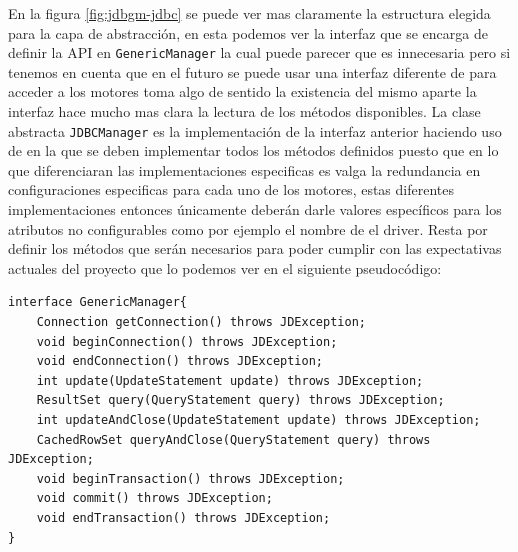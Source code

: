En la figura \ref{fig:jdbgm-jdbc} se puede ver mas claramente la estructura elegida para la capa de abstracción, en esta podemos ver la interfaz que se encarga de definir la API en \verb=GenericManager= la cual puede parecer que es innecesaria pero si tenemos en cuenta que en el futuro se puede usar una interfaz diferente de \jd para acceder a los motores toma algo de sentido la existencia del mismo aparte la interfaz hace mucho mas clara la lectura de los métodos disponibles. La clase abstracta \verb=JDBCManager= es la implementación de la interfaz anterior haciendo uso de \jd en la que se deben implementar todos los métodos definidos puesto que en lo que diferenciaran las implementaciones especificas es valga la redundancia en configuraciones especificas para cada uno de los motores, estas diferentes implementaciones entonces únicamente deberán darle valores específicos para los atributos no configurables como por ejemplo el nombre de el driver. Resta por definir los métodos que serán necesarios para poder cumplir con las expectativas actuales del proyecto que lo podemos ver en el siguiente pseudocódigo:
%
\begin{lstlisting}[title=interfaz GenericManager]
interface GenericManager{
	Connection getConnection() throws JDException;
	void beginConnection() throws JDException;
	void endConnection() throws JDException;
	int update(UpdateStatement update) throws JDException;
	ResultSet query(QueryStatement query) throws JDException;
	int updateAndClose(UpdateStatement update) throws JDException;
	CachedRowSet queryAndClose(QueryStatement query) throws JDException;
	void beginTransaction() throws JDException;
	void commit() throws JDException;
	void endTransaction() throws JDException;
}
\end{lstlisting}
%
